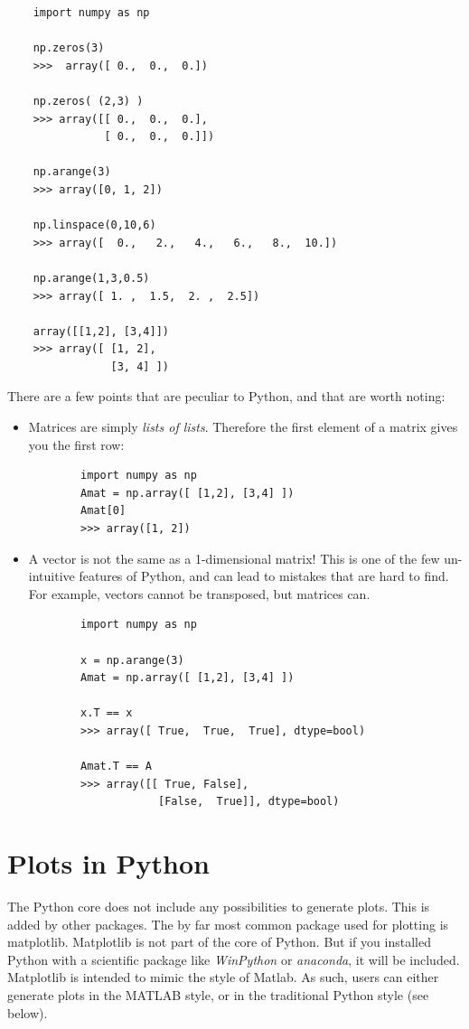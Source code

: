 \begin{lstlisting}
    import numpy as np

    np.zeros(3)
    >>>  array([ 0.,  0.,  0.])

    np.zeros( (2,3) )
    >>> array([[ 0.,  0.,  0.],
               [ 0.,  0.,  0.]])

    np.arange(3)
    >>> array([0, 1, 2])

    np.linspace(0,10,6)
    >>> array([  0.,   2.,   4.,   6.,   8.,  10.])

    np.arange(1,3,0.5)
    >>> array([ 1. ,  1.5,  2. ,  2.5])

    array([[1,2], [3,4]])
    >>> array([ [1, 2],
                [3, 4] ])
\end{lstlisting}

There are a few points that are peculiar to Python, and that are worth noting:

\begin{itemize}
  \item Matrices are simply \emph{lists of lists}. Therefore the first element of a matrix gives you the first row:
    \begin{lstlisting}
        import numpy as np
        Amat = np.array([ [1,2], [3,4] ])
        Amat[0]
        >>> array([1, 2])
    \end{lstlisting}
  \item A vector is not the same as a 1-dimensional matrix! This is one of the few un-intuitive features of Python, and can lead to mistakes that are hard to find. For example, vectors cannot be transposed, but matrices can.
      \begin{lstlisting}
        import numpy as np

        x = np.arange(3)
        Amat = np.array([ [1,2], [3,4] ])

        x.T == x
        >>> array([ True,  True,  True], dtype=bool)

        Amat.T == A
        >>> array([[ True, False],
                    [False,  True]], dtype=bool)
    \end{lstlisting}
\end{itemize}

\section{Plots in Python}

The Python core does not include any possibilities to generate plots. This is added by other packages. The by far most common package used for plotting is \Gls{matplotlib}. Matplotlib is not part of the core of Python. But if you installed Python with a scientific package like \emph{WinPython} or \emph{anaconda}, it will be included. Matplotlib is intended to mimic the style of Matlab. As such, users can either generate plots in the MATLAB style, or in the traditional Python style (see below).


